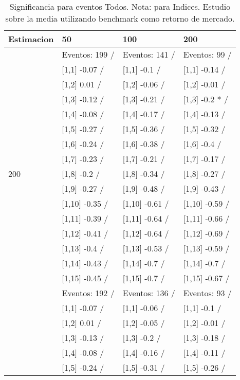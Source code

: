 \begin{table}

\caption{Significancia para eventos Todos. Nota: para Indices. Estudio sobre la media utilizando benchmark como retorno de mercado.}
\centering
\begin{tabular}[t]{llll}
\toprule
Estimacion & 50 & 100 & 200\\
\midrule
 & Eventos:  199 / & Eventos:  141 / & Eventos:  99 /\\
 & {}[1,1] -0.07  / & {}[1,1] -0.1  / & {}[1,1] -0.14  /\\
 & {}[1,2] 0.01  / & {}[1,2] -0.06  / & {}[1,2] -0.01  /\\
 & {}[1,3] -0.12  / & {}[1,3] -0.21  / & {}[1,3] -0.2 * /\\
 & {}[1,4] -0.08  / & {}[1,4] -0.17  / & {}[1,4] -0.13  /\\
\addlinespace
 & {}[1,5] -0.27  / & {}[1,5] -0.36  / & {}[1,5] -0.32  /\\
 & {}[1,6] -0.24  / & {}[1,6] -0.38  / & {}[1,6] -0.4  /\\
 & {}[1,7] -0.23  / & {}[1,7] -0.21  / & {}[1,7] -0.17  /\\
200 & {}[1,8] -0.2  / & {}[1,8] -0.34  / & {}[1,8] -0.27  /\\
 & {}[1,9] -0.27  / & {}[1,9] -0.48  / & {}[1,9] -0.43  /\\
\addlinespace
 & {}[1,10] -0.35  / & {}[1,10] -0.61  / & {}[1,10] -0.59  /\\
 & {}[1,11] -0.39  / & {}[1,11] -0.64  / & {}[1,11] -0.66  /\\
 & {}[1,12] -0.41  / & {}[1,12] -0.64  / & {}[1,12] -0.69  /\\
 & {}[1,13] -0.4  / & {}[1,13] -0.53  / & {}[1,13] -0.59  /\\
 & {}[1,14] -0.43  / & {}[1,14] -0.7  / & {}[1,14] -0.7  /\\
\addlinespace
 & {}[1,15] -0.45  / & {}[1,15] -0.7  / & {}[1,15] -0.67  /\\
 & Eventos:  192 / & Eventos:  136 / & Eventos:  93 /\\
 & {}[1,1] -0.07  / & {}[1,1] -0.06  / & {}[1,1] -0.1  /\\
 & {}[1,2] 0.01  / & {}[1,2] -0.05  / & {}[1,2] -0.01  /\\
 & {}[1,3] -0.13  / & {}[1,3] -0.2  / & {}[1,3] -0.18  /\\
\addlinespace
 & {}[1,4] -0.08  / & {}[1,4] -0.16  / & {}[1,4] -0.11  /\\
 & {}[1,5] -0.24  / & {}[1,5] -0.31  / & {}[1,5] -0.26  /\\

\end{tabular}
\end{table}
